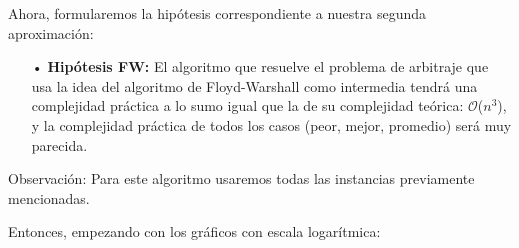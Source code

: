 \documentclass[11pt,a4paper]{article}
\begin{document}
Ahora, formularemos la hip\'otesis correspondiente a nuestra segunda aproximaci\'on:

\begin{itemize}
    \item[•] \textbf{Hip\'otesis FW:} El algoritmo que resuelve el problema de arbitraje que usa la idea del algoritmo de Floyd-Warshall como intermedia tendr\'a una complejidad pr\'actica a lo sumo igual que la de su complejidad te\'orica: $\mathcal{O}$($n^{3}$), y la complejidad pr\'actica de todos los casos (peor, mejor, promedio) ser\'a muy parecida.
\end{itemize}

Observaci\'on: Para este algoritmo usaremos todas las instancias previamente mencionadas.

Entonces, empezando con los gr\'aficos con escala logar\'itmica:
\end{document}
